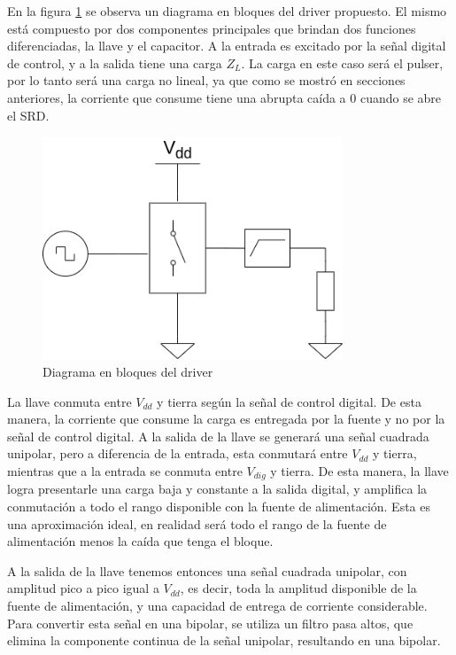 En la figura \ref{fig:driver_block_diagram} se observa un diagrama en bloques
del driver propuesto. El mismo está compuesto por dos componentes principales
que brindan dos funciones diferenciadas, la llave y el capacitor. A la entrada
es excitado por la señal digital de control, y a la salida tiene una carga
$Z_L$. La carga en este caso será el pulser, por lo tanto será una carga no
lineal, ya que como se mostró en secciones anteriores, la corriente que consume
tiene una abrupta caída a 0 cuando se abre el SRD.

\begin{figure}[tbp]
    \centering
    \includegraphics[width=0.8\textwidth]{images/driver.drawio.png}
    \caption{Diagrama en bloques del driver}
    \label{fig:driver_block_diagram}
\end{figure}

La llave conmuta entre $V_{dd}$ y tierra según la señal de control digital. De
esta manera, la corriente que consume la carga es entregada por la fuente y no
por la señal de control digital. A la salida de la llave se generará una señal
cuadrada unipolar, pero a diferencia de la entrada, esta conmutará entre
$V_{dd}$ y tierra, mientras que a la entrada se conmuta entre $V_{dig}$ y
tierra. De esta manera, la llave logra presentarle una carga baja y constante a
la salida digital, y amplifica la conmutación a todo el rango disponible con la
fuente de alimentación. Esta es una aproximación ideal, en realidad será todo el
rango de la fuente de alimentación menos la caída que tenga el bloque.

A la salida de la llave tenemos entonces una señal cuadrada unipolar, con
amplitud pico a pico igual a $V_{dd}$, es decir, toda la amplitud disponible de
la fuente de alimentación, y una capacidad de entrega de corriente considerable.
Para convertir esta señal en una bipolar, se utiliza un filtro pasa altos, que
elimina la componente continua de la señal unipolar, resultando en una bipolar.


